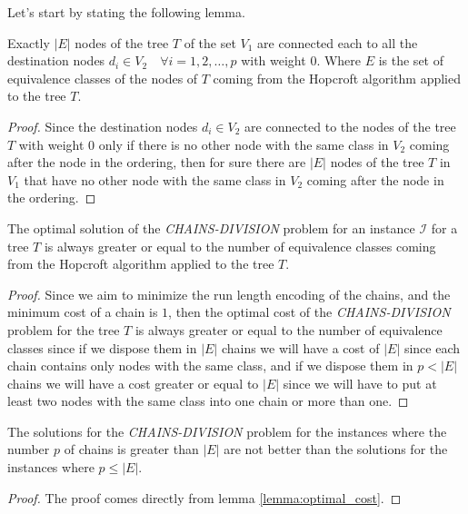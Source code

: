Let's start by stating the following lemma.

\begin{lemma} \label{lemma:all_destinations}
    Exactly $|E|$ nodes of the tree $T$ of the set $V_1$ are connected each to all the destination nodes $d_i \in V_2 \quad \forall i = 1, 2, \dots, p$ with weight $0$. Where $E$ is the set of equivalence classes of the nodes of $T$ coming from the Hopcroft algorithm applied to the tree $T$.
\end{lemma}

\begin{proof}
    Since the destination nodes $d_i \in V_2$ are connected to the nodes of the tree $T$ with weight $0$ only if there is no other node with the same class in $V_2$ coming after the node in the ordering, then for sure there are $|E|$ nodes of the tree $T$ in $V_1$ that have no other node with the same class in $V_2$ coming after the node in the ordering.
\end{proof}

\begin{lemma} \label{lemma:optimal_cost}
    The optimal solution of the \textit{CHAINS-DIVISION} problem for an instance $\mathcal I$ for a tree $T$ is always greater or equal to the number of equivalence classes coming from the Hopcroft algorithm applied to the tree $T$.
\end{lemma}

\begin{proof}
    Since we aim to minimize the run length encoding of the chains, and the minimum cost of a chain is $1$, then the optimal cost of the \textit{CHAINS-DIVISION} problem for the tree $T$ is always greater or equal to the number of equivalence classes since if we dispose them in $|E|$ chains we will have a cost of $|E|$ since each chain contains only nodes with the same class, and if we dispose them in $p < |E|$ chains we will have a cost greater or equal to $|E|$ since we will have to put at least two nodes with the same class into one chain or more than one.
\end{proof}

\begin{lemma} \label{lemma:p_less_than_E}
    The solutions for the \textit{CHAINS-DIVISION} problem for the instances where the number $p$ of chains is greater than $|E|$ are not better than the solutions for the instances where $p \leq |E|$.
\end{lemma}

\begin{proof}
    The proof comes directly from lemma \ref{lemma:optimal_cost}.
\end{proof}


